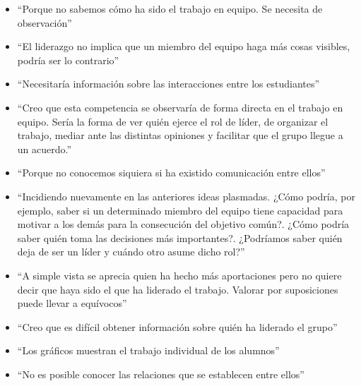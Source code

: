 \begin{itemize}
\item ``Porque no sabemos cómo ha sido el trabajo en equipo. Se necesita de observación''
\item ``El liderazgo no implica que un miembro del equipo haga más cosas visibles, podría ser lo contrario''
\item ``Necesitaría información sobre las interacciones entre los estudiantes''
\item ``Creo que esta competencia se observaría de forma directa en el trabajo en equipo. Sería la forma de ver quién ejerce el rol de líder, de organizar el trabajo, mediar ante las distintas opiniones y facilitar que el grupo llegue a un acuerdo.''
\item ``Porque no conocemos siquiera si ha existido comunicación entre ellos''
\item ``Incidiendo nuevamente en las anteriores ideas plasmadas. ¿Cómo podría, por ejemplo, saber si un determinado miembro del equipo tiene capacidad para motivar a los demás para la consecución del objetivo común?. ¿Cómo podría saber quién toma las decisiones más importantes?. ¿Podríamos saber quién deja de ser un líder y cuándo otro asume dicho rol?''
\item ``A simple vista se aprecia quien ha hecho más aportaciones pero no quiere decir que haya sido el que ha liderado el trabajo. Valorar por suposiciones puede llevar a equívocos''
\item ``Creo que es difícil obtener información sobre quién ha liderado el grupo''
\item ``Los gráficos muestran el trabajo individual de los alumnos''
\item ``No es posible conocer las relaciones que se establecen entre ellos''
\end{itemize}
